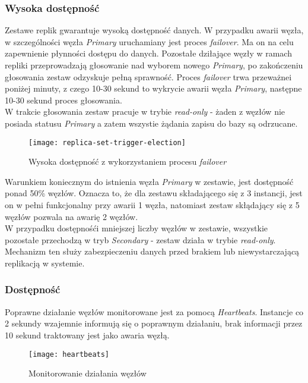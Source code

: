 \subsubsection{Wysoka dostępność}
Zestawe replik gwarantuje wysoką dostępność danych. W przypadku awarii węzła, w szczególności węzła \textit{Primary} uruchamiany jest proces \textit{failover}. Ma on na celu zapewnienie płynności dostępu do danych. Pozostałe dziłające węzły w ramach repliki przeprowadzają głosowanie nad wyborem nowego \textit{Primary}, po zakończeniu głosowania zestaw odzyskuje pełną sprawność. Proces \textit{failover} trwa przeważnei poniżej minuty, z czego 10-30 sekund to wykrycie awarii węzła \textit{Primary}, następne 10-30 sekund proces głosowania. \\
W trakcie głosowania zestaw pracuje w trybie \textit{read-only} - żaden z węzłów nie posiada statusu \textit{Primary} a zatem wszystie żądania zapisu do bazy są odrzucane. \\

\begin{figure}[H]
	\centering
	\texttt{[image: replica-set-trigger-election]}
	\caption{Wysoka dostępność z wykorzystaniem procesu \textit{failover}}
\end{figure}

Warunkiem koniecznym do istnienia węzła \textit{Primary} w zestawie, jest dostępność ponad 50\% węzłów. Oznacza to, że dla zestawu składającego się z 3 instancji, jest on w pełni funkcjonalny przy awarii 1 węzła, natomiast zestaw skłądający się z 5 węzłów pozwala na awarię 2 węzłów. \\
W przypadku dostępnośći mniejszej liczby węzłów w zestawie, wszystkie pozostałe przechodzą w tryb \textit{Secondary} - zestaw działa w trybie \textit{read-only}. Mechanizm ten służy zabezpieczeniu danych przed brakiem lub niewystarczającą replikacją w systemie.

\subsubsection{Dostępność}
Poprawne działanie węzłów monitorowane jest za pomocą \textit{Heartbeats}. Instancje co 2 sekundy wzajemnie informują się o poprawnym działaniu, brak informacji przez 10 sekund traktowany jest jako awaria węzłą.

\begin{figure}[H]
	\centering
	\texttt{[image: heartbeats]}
	\caption{Monitorowanie działania węzłów}
\end{figure}
